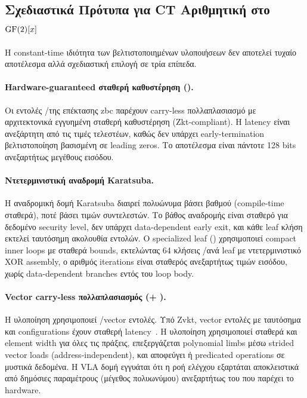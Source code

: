 \subsection{Σχεδιαστικά Πρότυπα για CT Αριθμητική στο \texorpdfstring{$\mathrm{GF}(2)[x]$}{GF(2)[x]}}
\label{ssec:ct-design-patterns}

Η constant-time ιδιότητα των βελτιστοποιημένων υλοποιήσεων δεν αποτελεί
τυχαίο αποτέλεσμα αλλά σχεδιαστική επιλογή σε τρία επίπεδα.

\paragraph{Hardware-guaranteed σταθερή καθυστέρηση (\Zbc).}
Οι εντολές \clmul/\clmulh της επέκτασης \gls{zbc} παρέχουν carry-less
πολλαπλασιασμό με αρχιτεκτονικά εγγυημένη σταθερή καθυστέρηση (Zkt-compliant).
Η latency είναι ανεξάρτητη από τις τιμές τελεστέων, καθώς δεν υπάρχει
early-termination βελτιστοποίηση βασισμένη σε leading zeros. Το αποτέλεσμα
είναι πάντοτε \num{128} bits ανεξαρτήτως μεγέθους εισόδου.

\paragraph{Ντετερμινιστική αναδρομή Karatsuba.}
Η αναδρομική δομή Karatsuba διαιρεί πολυώνυμα βάσει βαθμού (compile-time
σταθερά), ποτέ βάσει τιμών συντελεστών. Το βάθος αναδρομής είναι σταθερό
για δεδομένο security level, δεν υπάρχει data-dependent early exit, και
κάθε leaf κλήση εκτελεί ταυτόσημη ακολουθία εντολών. Ο specialized
leaf () χρησιμοποιεί compact inner loops με σταθερά
bounds, εκτελώντας \num{64} κλήσεις \clmul/\clmulh ανά leaf με
ντετερμινιστικό XOR assembly, ο αριθμός iterations είναι σταθερός
ανεξαρτήτως τιμών εισόδου, χωρίς data-dependent branches εντός του loop
body.

\paragraph{Vector carry-less πολλαπλασιασμός (\RVV + \Zvbc).}
Η υλοποίηση  χρησιμοποιεί \vclmul/\vclmulh vector
εντολές. Υπό Zvkt, vector εντολές με ταυτόσημα \VLEN και \SEW
configurations έχουν σταθερή latency~\cite{RISCV-crypto-vol2}. Η \RVV υλοποίηση χρησιμοποιεί
σταθερά \LMUL και element width για όλες τις πράξεις, επεξεργάζεται
polynomial limbs μέσω strided vector loads (address-independent), και
αποφεύγει  ή predicated operations σε μυστικά δεδομένα.
Η VLA δομή εγγυάται ότι η ροή ελέγχου εξαρτάται αποκλειστικά από δημόσιες
παραμέτρους (μέγεθος πολυωνύμου) ανεξαρτήτως του \VLEN που παρέχει το
hardware.

